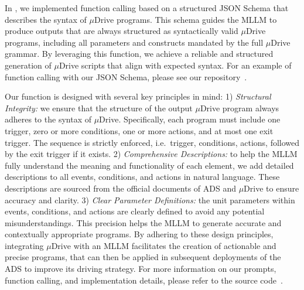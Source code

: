 In \coolname, we implemented function calling based on a structured JSON Schema that describes the syntax of $\mu$Drive programs. This schema guides the MLLM to produce outputs that are always structured as syntactically valid $\mu$Drive programs, including all parameters and constructs mandated by the full $\mu$Drive grammar. By leveraging this function, we achieve a reliable and structured generation of $\mu$Drive scripts that align with expected syntax. For an example of function calling with our JSON Schema, please see our repository~\cite{source_code}.







Our function is designed with several key principles in mind:
1) \emph{Structural Integrity:} we ensure that the structure of the output $\mu$Drive program always adheres to the syntax of $\mu$Drive. Specifically, each program must include one trigger, zero or more conditions, one or more actions, and at most one exit trigger. The sequence is strictly enforced, i.e.~trigger, conditions, actions, followed by the exit trigger if it exists.
2) \emph{Comprehensive Descriptions:} to help the MLLM fully understand the meaning and functionality of each element, we add detailed descriptions to all events, conditions, and actions in natural language. These descriptions are sourced from the official documents of ADS and $\mu$Drive to ensure accuracy and clarity.
3) \emph{Clear Parameter Definitions:} the unit parameters within events, conditions, and actions are clearly defined to avoid any potential misunderstandings. This precision helps the MLLM to generate accurate and contextually appropriate programs.
By adhering to these design principles, integrating $\mu$Drive with an MLLM facilitates the creation of actionable and precise programs, that can then be applied in subsequent deployments of the ADS to improve its driving strategy.
For more information on our prompts, function calling, and implementation details, please refer to the 
source code~\cite{source_code}.


